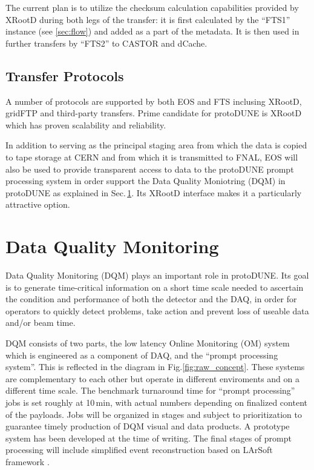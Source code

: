 \documentclass[a4paper]{jpconf}
\newcommand{\pd}{protoDUNE\xspace}
\begin{document}
The current plan is to utilize the checksum calculation capabilities provided by XRootD
during both legs of the transfer: it is first calculated by the ``FTS1'' instance
(see \ref{sec:flow}) and added as a part of the metadata. It is then used in further transfers
by ``FTS2'' to CASTOR and dCache.

\subsection{Transfer Protocols}
A number of protocols are supported by both EOS and FTS inclusing XRootD, gridFTP
and third-party transfers. Prime candidate for \pd is XRootD which has proven scalability
and reliability.

In addition to serving as the principal staging area from which the data is copied to
tape storage at CERN and from which it is transmitted to FNAL, 
EOS will also be used to provide transparent access to data to the
\pd prompt processing system 
in order support the Data Quality Moniotring (DQM) in \pd as explained in Sec.\,\ref{sec:dqm}.
Its XRootD interface makes it a particularly attractive option.

\section{Data Quality Monitoring}
\label{sec:dqm}
Data Quality Monitoring (DQM) plays an important role in \pd.
Its goal is to generate time-critical information on a short time
scale needed to ascertain the condition
and performance of both the detector and the DAQ,
in order for operators to quickly detect problems, take action and prevent loss
of useable data and/or beam time.

DQM consists of two parts,  the low latency Online Monitoring (OM)
system which is engineered as a component of DAQ, and
the ``prompt processing system''. This is reflected in the diagram
in Fig.\ref{fig:raw_concept}.
These systems are complementary to each other but operate
in different enviroments and on a different time scale.
The benchmark turnaround time for ``prompt processing'' jobs 
is set roughly at 10\,min, with actual numbers depending on
finalized content of the payloads. Jobs will be organized in stages
and subject to prioritization to guarantee timely production of DQM
visual and data products. A prototype system has been developed at
the time of writing. The final stages of prompt processing will
include simplified event reconstruction based on LArSoft framework
\cite{larsoft}.
\end{document}
